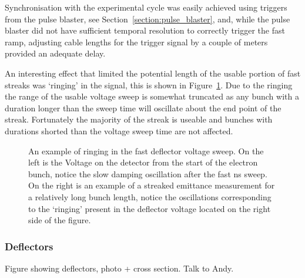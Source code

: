 Synchronisation with the experimental cycle was easily achieved using triggers from the pulse blaster, see Section~\ref{section:pulse_blaster}, and, while the pulse blaster did not have sufficient temporal resolution to correctly trigger the fast ramp, adjusting cable lengths for the trigger signal by a couple of meters provided an adequate delay.

An interesting effect that limited the potential length of the usable portion of fast streaks was `ringing' in the signal, this is shown in Figure~\ref{figure:ringing}.
Due to the ringing the range of the usable voltage sweep is somewhat truncated as any bunch with a duration longer than the sweep time will oscillate about the end point of the streak.
Fortunately the majority of the streak is useable and bunches with durations shorted than the voltage sweep time are not affected.

\begin{figure}
    \center
    
    \caption{An example of ringing in the fast deflector voltage sweep. On the left is the Voltage on the detector from the start of the electron bunch, notice the slow damping oscillation after the fast \unit[10]{ns} sweep. On the right is an example of a streaked emittance measurement for a relatively long bunch length, notice the oscillations corresponding to the `ringing' present in the deflector voltage located on the right side of the figure.}
    \label{figure:ringing}
\end{figure}

\subsubsection{Deflectors}

{\color{red}Figure showing deflectors, photo + cross section. Talk to Andy.}


